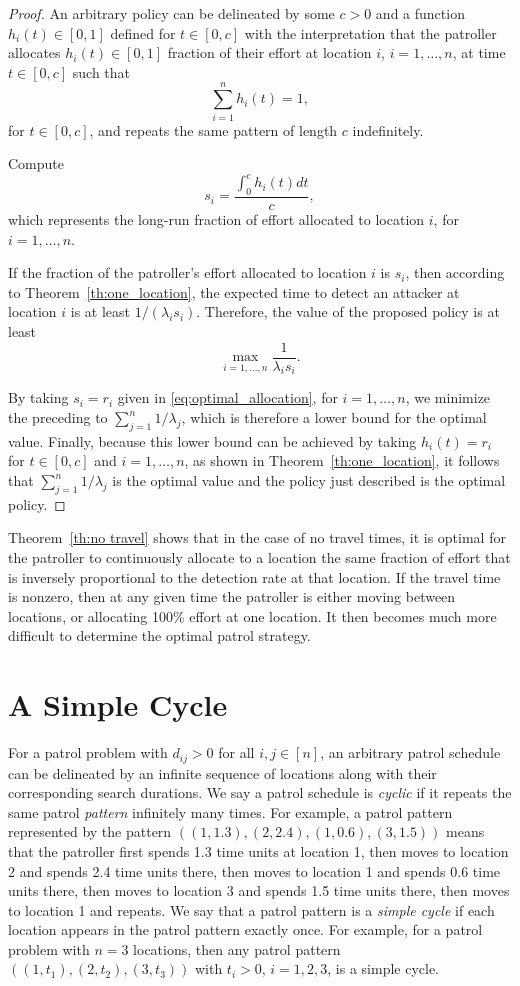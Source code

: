 \documentclass[11pt,a4paper]{article}
\begin{document}
\begin{proof}
An arbitrary policy can be delineated by some $c > 0$ and a function $h_i(t) \in [0,1]$ defined for $t \in [0,c]$ with the interpretation that the patroller allocates $h_i(t) \in [0,1]$ fraction of their effort at location $i$, $i=1,\ldots,n$, at time $t \in [0,c]$ such that
\[
\sum_{i=1}^n h_i(t) = 1,
\]
for $t \in [0,c]$,
and repeats the same pattern of length $c$ indefinitely.

Compute
\[
s_i = \frac{\int_0^c h_i(t) dt}{c},
\]
which represents the long-run fraction of effort allocated to location $i$, for $i=1,\ldots,n$.

If the fraction of the patroller's effort allocated to location $i$ is $s_i$, then according to Theorem~\ref{th:one_location}, the expected time to detect an attacker at location $i$ is at least $1/ (\lambda_i s_i)$.
Therefore, the value of the proposed policy is at least
\[
\max_{i=1,\ldots,n} \frac{1}{\lambda_i s_i}.
\]

By taking $s_i = r_i$ given in \eqref{eq:optimal_allocation}, for $i=1,\ldots,n$, we minimize the preceding to $\sum_{j=1}^n 1/\lambda_j$, which is therefore a lower bound for the optimal value.
Finally, because this lower bound can be achieved by taking $h_i(t) = r_i$ for $t \in [0,c]$ and $i=1,\ldots,n$, as shown in Theorem~\ref{th:one_location}, it follows that $\sum_{j=1}^n 1/\lambda_j$ is the optimal value and the policy just described is the optimal policy.
\end{proof}


Theorem~\ref{th:no travel} shows that in the case of no travel times, it is optimal for the patroller to continuously allocate to a location the same fraction of effort that is inversely proportional to the detection rate at that location.
If the travel time is nonzero, then at any given time the patroller is either moving between locations, or allocating 100\% effort at one location.
It then becomes much more difficult to determine the optimal patrol strategy.


\section{A Simple Cycle} \label{sec: a simple cycle}
For a patrol problem with $d_{ij} > 0$ for all $i,j \in [n]$, an arbitrary patrol schedule can be delineated by an infinite sequence of locations along with their corresponding search durations.
We say a patrol schedule is \textit{cyclic} if it repeats the same patrol \textit{pattern} infinitely many times.
For example, a patrol pattern represented by the pattern $((1,1.3), (2,2.4),(1,0.6), (3,1.5))$ means that the patroller first spends 1.3 time units at location 1, then moves to location 2 and spends 2.4 time units there, then moves to location 1 and spends 0.6 time units there, then moves to location 3 and spends 1.5 time units there, then moves to location 1 and repeats.
We say that a patrol pattern is a \textit{simple cycle} if each location appears in the patrol pattern exactly once.
For example, for a patrol problem with $n=3$ locations, then any patrol pattern $((1, t_1),(2, t_2),(3,t_3))$ with $t_i > 0$, $i=1,2,3$, is a simple cycle.
\end{document}
